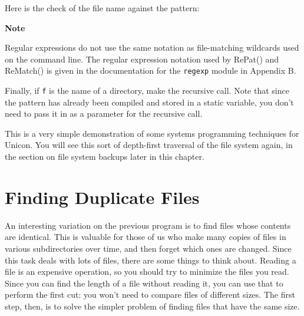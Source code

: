 
Here is the check of the file name against the pattern: 


{\sffamily\bfseries
Note}

{\sffamily
Regular expressions do not use the same notation as file-matching
wildcards used on the command line. The regular expression notation
used by RePat() and ReMatch() is given in the documentation for the
\texttt{regexp} module in Appendix B.}

Finally, if \texttt{f} is the name of a directory, make the recursive
call. Note that since the pattern has already been compiled and stored
in a static variable, you don't need to pass it in as
a parameter for the recursive call.


This is a very simple demonstration of some systems programming
techniques for Unicon. You will see this sort of depth-first traversal
of the file system again, in the section on file system backups later
in this chapter.

\section{Finding Duplicate Files}

An interesting variation on the previous program is to find files whose
contents are identical. This is valuable for those of us who make many
copies of files in various subdirectories over time, and then forget
which ones are changed. Since this task deals with lots of files, there
are some things to think about. Reading a file is an expensive
operation, so you should try to minimize the files you read. Since you
can find the length of a file without reading it, you can use that to
perform the first cut: you won't need to compare files
of different sizes. The first step, then, is to solve the simpler
problem of finding files that have the same size.

